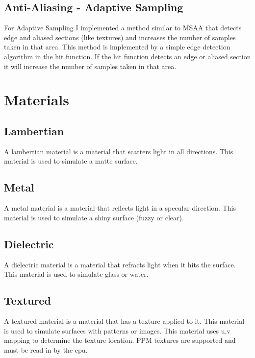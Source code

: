\documentclass{article}
\begin{document}
    \subsection{Anti-Aliasing - Adaptive Sampling}
    For Adaptive Sampling I implemented a method similar to MSAA that detects edge and aliased sections (like textures) and increases the number of samples taken in that area. This method is implemented by a simple edge detection algorithm in the hit function. If the hit function detects an edge or aliased section it will increase the number of samples taken in that area. \par


\section{Materials}



    \subsection{Lambertian}
    A lambertian material is a material that scatters light in all directions. This material is used to simulate a matte surface. \par


    \subsection{Metal}
    A metal material is a material that reflects light in a specular direction. This material is used to simulate a shiny surface (fuzzy or clear). \par



    \subsection{Dielectric}
    A dielectric material is a material that refracts light when it hits the surface. This material is used to simulate glass or water. \par



    \subsection{Textured}
    A textured material is a material that has a texture applied to it. This material is used to simulate surfaces with patterns or images. This material uses u,v mapping to determine the texture location. PPM textures are supported and must be read in by the cpu. \par
\end{document}
